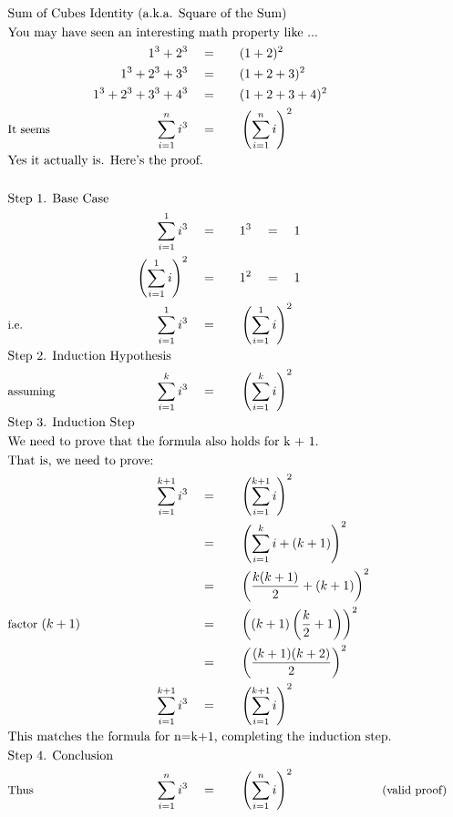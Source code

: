 \begin{alignat*}{5}
&\rlap{\text{Sum of Cubes Identity (a.k.a. Square of the Sum)}}\\
&\rlap{\text{You may have seen an interesting math property like ...}}\\
&\,&1^3+2^3\quad&=\quad&&(1+2)^2\\
&\,&1^3+2^3+3^3\quad&=\quad&&(1+2+3)^2\\
&\,&1^3+2^3+3^3+4^3\quad&=\quad&&(1+2+3+4)^2\\
&\small\text{It seems}&\sum_{i=1}^{n}i^3\quad&=&&\left(\sum_{i=1}^{n}i\right)^2\\
&\rlap{\text{Yes it actually is. Here's the proof.}}\\ \\
&\rlap{\text{Step 1. Base Case}}\\
&\,&\sum_{i=1}^{1}i^3\quad&=&&1^3\quad=\quad1\\
&\,&\left(\sum_{i=1}^{1}i\right)^2\quad&=&&1^2\quad=\quad1\\
&\small\text{i.e.}&\sum_{i=1}^{1}i^3\quad&=&&\left(\sum_{i=1}^{1}i\right)^2\\
&\rlap{\text{Step 2. Induction Hypothesis}}\\
&\small\text{assuming}\qquad&\sum_{i=1}^{k}i^3\quad&=&&\left(\sum_{i=1}^{k}i\right)^2\\
&\rlap{\text{Step 3. Induction Step}}\\
&\rlap{\text{We need to prove that the formula also holds for k + 1.}}\\
&\rlap{\text{That is, we need to prove:}}\\
&\,&\sum_{i=1}^{k+1}i^3\quad&=&&\left(\sum_{i=1}^{k+1}i\right)^2\\
&\,&\,&=&&\left(\sum_{i=1}^{k}i+(k+1)\right)^2\\
&\,&\,&=&&\left(\frac{k(k+1)}{2}+(k+1)\right)^2\\
&\small\text{factor }(k+1)&\,&=&&\left((k+1)\left(\frac{k}{2}+1\right)\right)^2\\
&\,&\,&=&&\left(\frac{(k+1)(k+2)}{2}\right)^2\\
&\,&\sum_{i=1}^{k+1}i^3\quad&=&&\left(\sum_{i=1}^{k+1}i\right)^2\\
&\rlap{\text{This matches the formula for }n=k+1\text{, completing the induction step.}}\\
&\rlap{\text{Step 4. Conclusion}}\\
&\small\text{Thus}&\sum_{i=1}^{n}i^3\quad&=&&\left(\sum_{i=1}^{n}i\right)^2\qquad&&\small\text{(valid proof)}\\
\end{alignat*}
